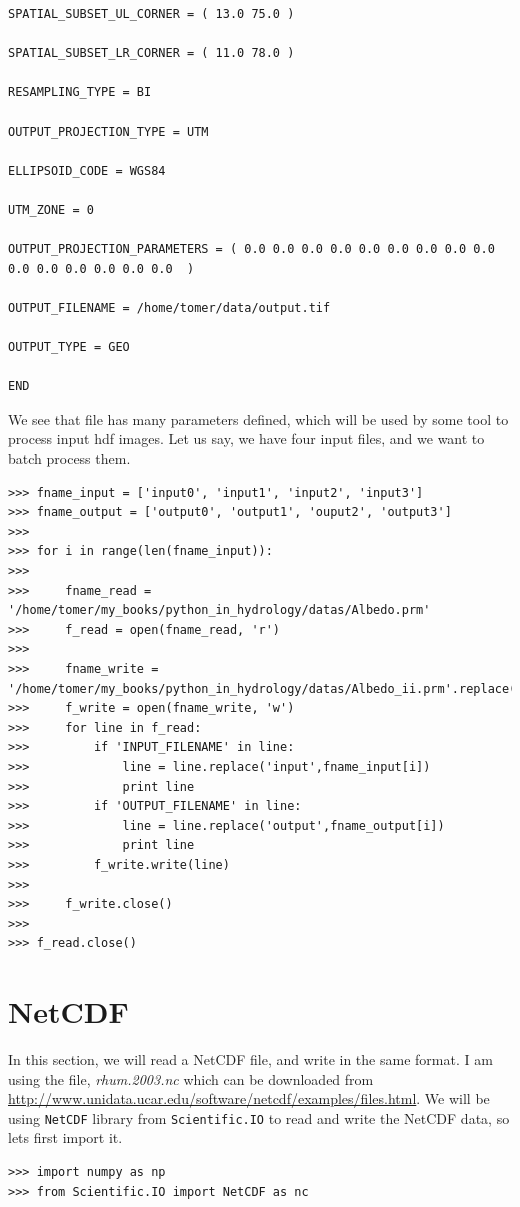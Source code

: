 \documentclass[10pt]{book}
\begin{document}
{\begin{verbatim}
SPATIAL_SUBSET_UL_CORNER = ( 13.0 75.0 )

SPATIAL_SUBSET_LR_CORNER = ( 11.0 78.0 )

RESAMPLING_TYPE = BI

OUTPUT_PROJECTION_TYPE = UTM

ELLIPSOID_CODE = WGS84

UTM_ZONE = 0

OUTPUT_PROJECTION_PARAMETERS = ( 0.0 0.0 0.0 0.0 0.0 0.0 0.0 0.0 0.0 0.0 0.0 0.0 0.0 0.0 0.0  )

OUTPUT_FILENAME = /home/tomer/data/output.tif

OUTPUT_TYPE = GEO

END
\end{verbatim} \afterverb
We see that file has many parameters defined, which will be used by some tool to process input hdf images. Let us say, we have four input files, and we want to batch process them.

\beforeverb \begin{verbatim}
>>> fname_input = ['input0', 'input1', 'input2', 'input3']
>>> fname_output = ['output0', 'output1', 'ouput2', 'output3']
>>> 
>>> for i in range(len(fname_input)):
>>>     
>>>     fname_read = '/home/tomer/my_books/python_in_hydrology/datas/Albedo.prm'
>>>     f_read = open(fname_read, 'r')
>>> 
>>>     fname_write = '/home/tomer/my_books/python_in_hydrology/datas/Albedo_ii.prm'.replace('ii',str(i))
>>>     f_write = open(fname_write, 'w')
>>>     for line in f_read:
>>>         if 'INPUT_FILENAME' in line:
>>>             line = line.replace('input',fname_input[i])
>>>             print line
>>>         if 'OUTPUT_FILENAME' in line:
>>>             line = line.replace('output',fname_output[i])
>>>             print line
>>>         f_write.write(line)
>>>         
>>>     f_write.close()
>>> 
>>> f_read.close()
\end{verbatim} \afterverb

\section{NetCDF}
In this section, we will read a NetCDF file, and write in the same format. I am using the file, \emph{rhum.2003.nc} which can be downloaded from \url{http://www.unidata.ucar.edu/software/netcdf/examples/files.html}. We will be using \verb"NetCDF" library from \verb"Scientific.IO" to read and write the NetCDF data, so lets first import it.
\beforeverb \begin{verbatim}
>>> import numpy as np
>>> from Scientific.IO import NetCDF as nc
\end{verbatim} \afterverb

}
\end{document}
